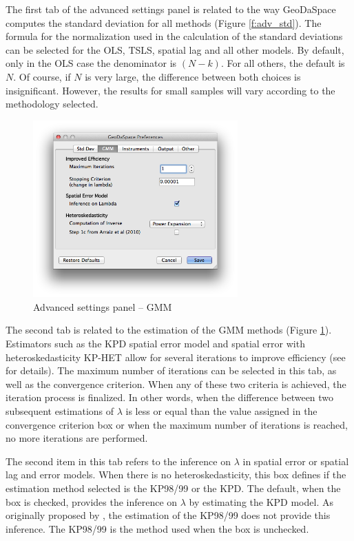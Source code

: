 \documentclass{article}
\begin{document}
The first tab of the advanced settings panel is related to the way GeoDaSpace computes the standard deviation for all methods (Figure \ref{f:adv_std}). The formula for the normalization used in the calculation of the standard deviations can be selected for the OLS, TSLS, spatial lag and all other models. By default, only in the OLS case the denominator is $(N-k)$. For all others, the default is $N$. Of course, if $N$ is very large, the difference between both choices is insignificant. However, the results for small samples will vary according to the methodology selected.
\FloatBarrier

\begin{figure}[htb]
\centering
\includegraphics[width=0.7\textwidth]{adv_gmm.png}
\caption{Advanced settings panel -- GMM}
\label{f:adv_gmm}
\end{figure}

The second tab is related to the estimation of the GMM methods (Figure \ref{f:adv_gmm}). Estimators such as the KPD spatial error model \citep{Drukker10} and spatial error with heteroskedasticity KP-HET \citep{Arraiz10} allow for several iterations to improve efficiency (see \citet{Anselin11} for details). The maximum number of iterations can be selected in this tab, as well as the convergence criterion. When any of these two criteria is achieved, the iteration process is finalized. In other words, when the difference between two subsequent estimations of $\lambda$ is less or equal than the value assigned in the convergence criterion box or when the maximum number of iterations is reached, no more iterations are performed.

The second item in this tab refers to the inference on $\lambda$ in spatial error or spatial lag and error models. When there is no heteroskedasticity, this box defines if the estimation method selected is the KP98/99 or the KPD. The default, when the box is checked, provides the inference on $\lambda$ by estimating the KPD model. As originally proposed by \citet{Kelejian98,Kelejian99}, the estimation of the KP98/99 does not provide this inference. The KP98/99 is the method used when the box is unchecked.
\end{document}
